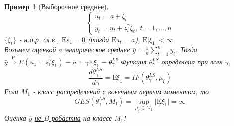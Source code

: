 \documentclass[12pt]{article}
\newtheorem*{example}{Пример}
\theoremstyle{basic_theorem}
\theoremstyle{name_theorem}
\def\eps{ \varepsilon }
\def\E{ \mathrm{E} }
\def\P{ \mathrm{P} }
\begin{document}
\begin{example}[Выборочное среднее]
    \[\begin{cases}
        u_t = a + \xi_t \\
        y_t = u_t + z^\gamma_t\xi_t, \ t=1,\ldots,n
    \end{cases}\]
    $\{\xi_t\}$ - н.о.р. сл.в., $\E\eps_1=0$ (тогда $\E u_t=a$), $\E\vert\xi_1\vert<\infty$ \\
    Возьмем оценкой $a$ эмпирическое среднее $\overline{y}=\frac{1}{n}\sum_{t=1}^ny_t$.
    Тогда $\overline{y}\xrightarrow{\P}E(u_1+z_1^\gamma\xi_1)=a+\gamma\E\xi_1=\theta^{LS}_\gamma$
    Функция $\theta_\gamma^{LS}$ определена при всех $\gamma$,
    \[\frac{d\theta_\gamma^{LS}}{d\gamma}=\E\xi_1=IF(\theta_\gamma^{LS}, \mu_\xi)\]
    Если $M_1$ - класс распределений с конечным первым моментом, то
    \[GES(\theta_\gamma^{LS}, M_1) = \sup_{\mu_\xi\in M_1} \vert\E\xi_1\vert = \infty\]
    Оценка $\overline{y}$ \underline{не $B$-робастна} на  классе $M_1$!
\end{example}
\end{document}
